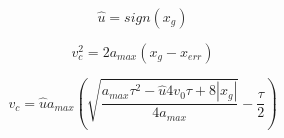 \begin{equation}
\label{eq:uhat}
\hat{u}=sign(x_g)
\end{equation}


\begin{equation}
\label{eq:vc2}
v_c^2 = 2 a_{max} \left(x_g -x_{err} \right)
\end{equation}

\begin{equation}
\label{eq:vcrit}
v_c=\hat{u} a_{max} \left(\sqrt{\frac{a_{max} \tau^2 - \hat{u} 4 v_0 \tau+8 |x_g|}{4 a_{max}}} - \frac{ \tau }{2}\right)
\end{equation}

